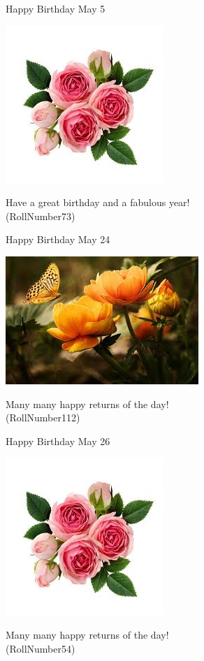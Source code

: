 \documentclass[table, landscape]{beamer}
\begin{document}
\begin{frame}{\color{blue}Happy Birthday }
{May 5}
\begin{center}
\includegraphics[height=0.5\textheight]{flowers/f5.jpeg}

Have a great birthday and a fabulous year! \\ \vspace{0.5cm}{\Large name66} (RollNumber73)
\end{center}
\end{frame}
\begin{frame}{\color{red}Happy Birthday }
{May 24}
\begin{center}
\includegraphics[height=0.5\textheight]{flowers/f7.jpeg}

Many many happy returns of the day! \\ \vspace{0.5cm}{\Large name105} (RollNumber112)
\end{center}
\end{frame}
\begin{frame}{\color{blue}Happy Birthday }
{May 26}
\begin{center}
\includegraphics[height=0.5\textheight]{flowers/f5.jpeg}

Many many happy returns of the day! \\ \vspace{0.5cm}{\Large name47} (RollNumber54)
\end{center}
\end{frame}
\end{document}
